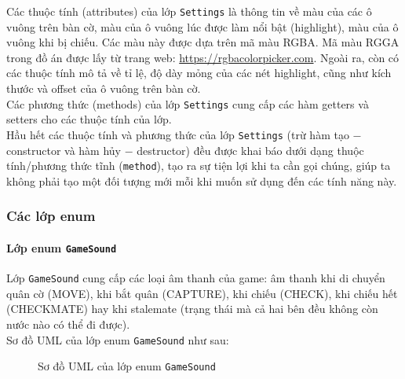Các thuộc tính (attributes) của lớp \lstinline{Settings} là thông tin về màu của các ô vuông trên bàn cờ, màu của ô vuông lúc được làm nổi bật (highlight), màu của ô vuông khi bị chiếu. Các màu này được dựa trên mã màu RGBA. Mã màu RGGA trong đồ án được lấy từ trang web: \url{https://rgbacolorpicker.com}. Ngoài ra, còn có các thuộc tính mô tả về tỉ lệ, độ dày mỏng của các nét highlight, cũng như kích thước và offset của ô vuông trên bàn cờ.\\
Các phương thức (methods) của lớp \lstinline{Settings} cung cấp các hàm getters và setters cho các thuộc tính của lớp.\\
Hầu hết các thuộc tính và phương thức của lớp \lstinline{Settings} (trừ hàm tạo $-$ constructor và hàm hủy $-$ destructor) đều được khai báo dưới dạng thuộc tính/phương thức tĩnh (\lstinline{method}), tạo ra sự tiện lợi khi ta cần gọi chúng, giúp ta không phải tạo một đối tượng mới mỗi khi muốn sử dụng đến các tính năng này.

\subsubsection{Các lớp enum}
\paragraph{Lớp enum \lstinline{GameSound}}
Lớp \lstinline{GameSound} cung cấp các loại âm thanh của game: âm thanh khi di chuyển quân cờ (MOVE), khi bắt quân (CAPTURE), khi chiếu (CHECK), khi chiếu hết (CHECKMATE) hay khi stalemate (trạng thái mà cả hai bên đều không còn nước nào có thể đi được).\\
Sơ đồ UML của lớp enum \lstinline{GameSound} như sau:
\begin{figure}[H]
\caption{Sơ đồ UML của lớp enum \lstinline{GameSound}}
\end{figure}

